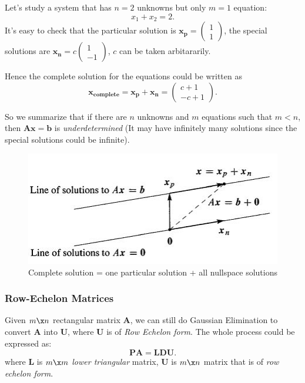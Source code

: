 \begin{example}
Let's study a system that has $n=2$ unknowns but only $m=1$ equation:
\[
x_1+x_2 = 2.
\]
It's easy to check that the particular solution is $\bm{x_p} = \begin{pmatrix}
1\\1
\end{pmatrix}$, the special solutions are $\bm{x_n} = c\begin{pmatrix}
1\\-1
\end{pmatrix}$, $c$ can be taken arbitararily.

Hence the complete solution for the equations could be written as 
\[\bm{x_{complete}} = \bm{x_p}+\bm{x_n} = \begin{pmatrix}
c+1\\-c+1
\end{pmatrix}.\]

So we summarize that if there are $n$ unknowns and $m$ equations such that $m<n$, then $\bm{Ax} = \bm b$ is \emph{underdetermined} (It may have infinitely many solutions since the special solutions could be infinite).
\begin{figure}[H]
\centering
\includegraphics{week2/complete.jpg}
\caption{Complete solution = one particular solution + all nullspace solutions}
\end{figure}
\end{example}
\subsubsection{Row-Echelon Matrices}
Given $m\x n$ rectangular matrix $\bm A$, we can still do Gaussian Elimination to convert $\bm A$ into $\bm U$, where $\bm U$ is of \emph{Row Echelon form}. The whole process could be expressed as:
\[
\bm{PA} = \bm{LDU}.
\]
where $\bm L$ is $m\x m$ \emph{lower triangular} matrix, $\bm U$ is $m\x n$ matrix that is of \emph{row echelon form}.

